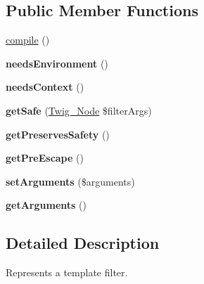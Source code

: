 \subsection*{Public Member Functions}
\begin{DoxyCompactItemize}
\item 
\hyperlink{interfaceTwig__FilterInterface_a259afe3cf6e89041a6841ebd72c9dce0}{compile} ()
\item 
{\bfseries needs\+Environment} ()\hypertarget{interfaceTwig__FilterInterface_a19bb43edf00d51c16f1580df404b7856}{}\label{interfaceTwig__FilterInterface_a19bb43edf00d51c16f1580df404b7856}

\item 
{\bfseries needs\+Context} ()\hypertarget{interfaceTwig__FilterInterface_ad6300003518eeded305467105c181fa5}{}\label{interfaceTwig__FilterInterface_ad6300003518eeded305467105c181fa5}

\item 
{\bfseries get\+Safe} (\hyperlink{classTwig__Node}{Twig\+\_\+\+Node} \$filter\+Args)\hypertarget{interfaceTwig__FilterInterface_aa57fd705ad3dd30d895882d7c1acae06}{}\label{interfaceTwig__FilterInterface_aa57fd705ad3dd30d895882d7c1acae06}

\item 
{\bfseries get\+Preserves\+Safety} ()\hypertarget{interfaceTwig__FilterInterface_a8a67c3e19423c69e25df2b8bbf14e2f7}{}\label{interfaceTwig__FilterInterface_a8a67c3e19423c69e25df2b8bbf14e2f7}

\item 
{\bfseries get\+Pre\+Escape} ()\hypertarget{interfaceTwig__FilterInterface_a9988e459c70fe2e5cf67837be22982c6}{}\label{interfaceTwig__FilterInterface_a9988e459c70fe2e5cf67837be22982c6}

\item 
{\bfseries set\+Arguments} (\$arguments)\hypertarget{interfaceTwig__FilterInterface_a07b1480ff632c0a76b57b2c4a0be0be3}{}\label{interfaceTwig__FilterInterface_a07b1480ff632c0a76b57b2c4a0be0be3}

\item 
{\bfseries get\+Arguments} ()\hypertarget{interfaceTwig__FilterInterface_a78e735db8e45b9364cdddff4023ba6a9}{}\label{interfaceTwig__FilterInterface_a78e735db8e45b9364cdddff4023ba6a9}

\end{DoxyCompactItemize}


\subsection{Detailed Description}
Represents a template filter.

